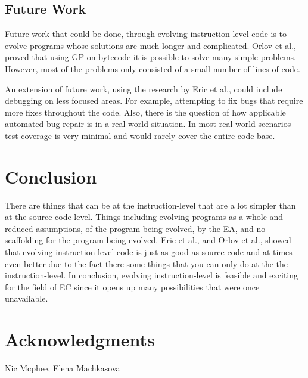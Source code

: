 \documentclass{sig-alternate}
\begin{document}
\subsection{Future Work}


Future work that could be done, through evolving instruction-level code is to evolve programs whose solutions are much longer and complicated. Orlov et al.,~\cite{FINCH:2011} proved that using GP on bytecode it is possible to solve many simple problems. However, most of the problems only consisted of a small number of lines of code.

An extension of future work, using the research by Eric et al., could include debugging on less focused areas. For example, attempting to fix bugs that require more fixes throughout the code. Also, there is the question of how applicable automated bug repair is in a real world situation. In most real world scenarios test coverage is very minimal and would rarely cover the entire code base.


\section{Conclusion}
There are things that can be at the instruction-level that are a lot simpler than at the source code level. Things including evolving programs as a whole and reduced assumptions, of the program being evolved, by the EA, and no scaffolding for the program being evolved. Eric et al., and Orlov et al., showed that evolving instruction-level code is just as good as source code and at times even better due to the fact there some things that you can only do at the the instruction-level. In conclusion, evolving instruction-level is feasible and exciting for the field of EC since it opens up many possibilities that were once unavailable.

\section{Acknowledgments}
Nic Mcphee, Elena Machkasova

%

%
%
\end{document}

